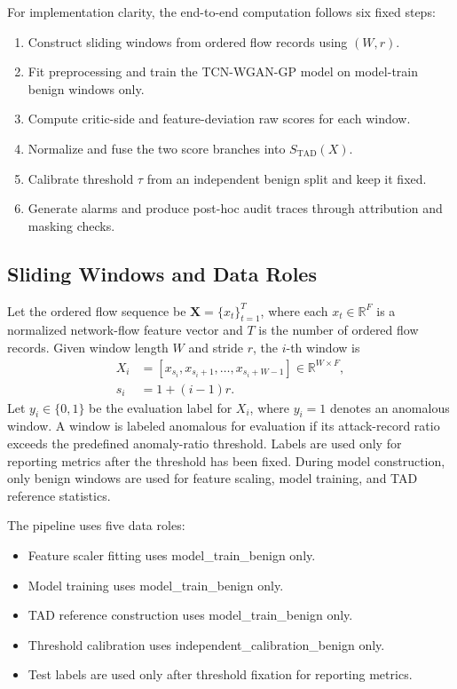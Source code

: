 For implementation clarity, the end-to-end computation follows six fixed steps:
\begin{enumerate}
    \item Construct sliding windows from ordered flow records using \((W,r)\).
    \item Fit preprocessing and train the TCN-WGAN-GP model on model-train benign windows only.
    \item Compute critic-side and feature-deviation raw scores for each window.
    \item Normalize and fuse the two score branches into \(S_{\mathrm{TAD}}(X)\).
    \item Calibrate threshold \(\tau\) from an independent benign split and keep it fixed.
    \item Generate alarms and produce post-hoc audit traces through attribution and masking checks.
\end{enumerate}

\subsection{Sliding Windows and Data Roles}

Let the ordered flow sequence be \(\mathbf{X}=\{x_t\}_{t=1}^{T}\), where each \(x_t\in\mathbb{R}^{F}\) is a normalized network-flow feature vector and \(T\) is the number of ordered flow records. Given window length \(W\) and stride \(r\), the \(i\)-th window is
\begin{align}
X_i &= [x_{s_i}, x_{s_i+1}, \ldots, x_{s_i+W-1}]
      \in \mathbb{R}^{W\times F}, \\
s_i &= 1+(i-1)r .
\end{align}
Let \(y_i\in\{0,1\}\) be the evaluation label for \(X_i\), where \(y_i=1\) denotes an anomalous window. A window is labeled anomalous for evaluation if its attack-record ratio exceeds the predefined anomaly-ratio threshold. Labels are used only for reporting metrics after the threshold has been fixed. During model construction, only benign windows are used for feature scaling, model training, and TAD reference statistics.

The pipeline uses five data roles:
\begin{itemize}
    \item Feature scaler fitting uses model\_train\_benign only.
    \item Model training uses model\_train\_benign only.
    \item TAD reference construction uses model\_train\_benign only.
    \item Threshold calibration uses independent\_calibration\_benign only.
    \item Test labels are used only after threshold fixation for reporting metrics.
\end{itemize}

